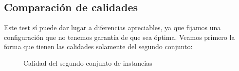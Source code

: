 \begin{figure}[H]
    \begin{minipage}[t]{\linewidth}
		\centering
		\label{fig:ejercicio-6-tiempos-grasp-4-4}
    \end{minipage}
\end{figure}

\subsection{Comparación de calidades}

Este test sí puede dar lugar a diferencias apreciables, ya que fijamos una configuración que no tenemos garantía de que sea óptima. Veamos primero la forma que tienen las calidades solamente del segundo conjunto:

\begin{figure}[H]
    \begin{minipage}[t]{\linewidth}
		\centering
		\label{fig:ejercicio-6-calidad-todos-conjunto-2}
        \caption{Calidad del segundo conjunto de instancias}
    \end{minipage}
\end{figure}

